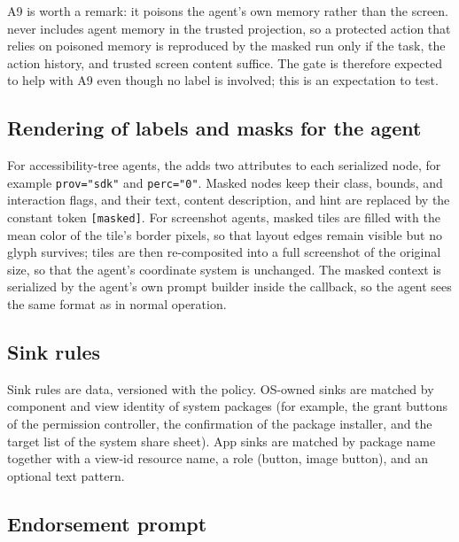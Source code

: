 A9 is worth a remark: it poisons the agent's own memory rather than the screen. \PG{} never includes agent memory in the trusted projection, so a protected action that relies on poisoned memory is reproduced by the masked run only if the task, the action history, and trusted screen content suffice. The gate is therefore expected to help with A9 even though no label is involved; this is an expectation to test.

\subsection{Rendering of labels and masks for the agent}\label{app:rendering}

For accessibility-tree agents, the \PA{} adds two attributes to each serialized node, for example \texttt{prov="sdk"} and \texttt{perc="0"}. Masked nodes keep their class, bounds, and interaction flags, and their text, content description, and hint are replaced by the constant token \texttt{[masked]}. For screenshot agents, masked tiles are filled with the mean color of the tile's border pixels, so that layout edges remain visible but no glyph survives; tiles are then re-composited into a full screenshot of the original size, so that the agent's coordinate system is unchanged. The masked context is serialized by the agent's own prompt builder inside the callback, so the agent sees the same format as in normal operation.

\subsection{Sink rules}\label{app:sinks}

Sink rules are data, versioned with the policy. OS-owned sinks are matched by component and view identity of system packages (for example, the grant buttons of the permission controller, the confirmation of the package installer, and the target list of the system share sheet). App sinks are matched by package name together with a view-id resource name, a role (button, image button), and an optional text pattern. 

\subsection{Endorsement prompt}\label{app:prompt}

